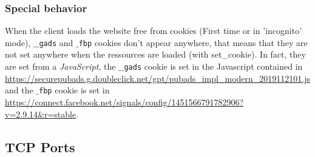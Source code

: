 \documentclass{article}
\begin{document}
\subsubsection{Special behavior}

When the client loads the website free from cookies (First time or in 'incognito' mode), \texttt{$\_\_$gads} and \texttt{$\_$fbp} cookies don't appear anywhere, that means that they are not set anywhere when the ressources are loaded (with set\_cookie). In fact, they are set from a \textit{JavaScript}, the \texttt{$\_\_$gads} cookie is set in the Javascript contained in \url{https://securepubads.g.doubleclick.net/gpt/pubads_impl_modern_2019112101.js} and the \texttt{$\_$fbp} cookie is set in \url{https://connect.facebook.net/signals/config/1451566791782906?v=2.9.14&r=stable}.

\subsection{TCP Ports}
\label{sub:ports}
\end{document}
